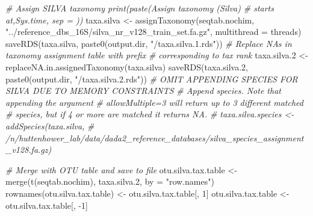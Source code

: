 \documentclass[
]{article}
\newenvironment{Shaded}{\begin{snugshade}}{\end{snugshade}}
\newcommand{\AttributeTok}[1]{\textcolor[rgb]{0.77,0.63,0.00}{#1}}
\newcommand{\CommentTok}[1]{\textcolor[rgb]{0.56,0.35,0.01}{\textit{#1}}}
\newcommand{\DecValTok}[1]{\textcolor[rgb]{0.00,0.00,0.81}{#1}}
\newcommand{\FloatTok}[1]{\textcolor[rgb]{0.00,0.00,0.81}{#1}}
\newcommand{\FunctionTok}[1]{\textcolor[rgb]{0.00,0.00,0.00}{#1}}
\newcommand{\NormalTok}[1]{#1}
\newcommand{\OtherTok}[1]{\textcolor[rgb]{0.56,0.35,0.01}{#1}}
\newcommand{\SpecialCharTok}[1]{\textcolor[rgb]{0.00,0.00,0.00}{#1}}
\newcommand{\StringTok}[1]{\textcolor[rgb]{0.31,0.60,0.02}{#1}}
\begin{document}
\begin{Shaded}
\begin{Highlighting}[]
\CommentTok{\# Assign SILVA taxonomy print(paste(\textquotesingle{}Assign taxonomy (Silva)}
\CommentTok{\# starts at\textquotesingle{},Sys.time, sep = \textquotesingle{} \textquotesingle{}))}
\NormalTok{taxa.silva }\OtherTok{\textless{}{-}} \FunctionTok{assignTaxonomy}\NormalTok{(seqtab.nochim, }\StringTok{"../reference\_dbs\_16S/silva\_nr\_v128\_train\_set.fa.gz"}\NormalTok{, }
    \AttributeTok{multithread =}\NormalTok{ threads)}
\FunctionTok{saveRDS}\NormalTok{(taxa.silva, }\FunctionTok{paste0}\NormalTok{(output.dir, }\StringTok{"/taxa.silva.1.rds"}\NormalTok{))}
\CommentTok{\# Replace NAs in taxonomy assignment table with prefix}
\CommentTok{\# corresponding to tax rank}
\NormalTok{taxa.silva}\FloatTok{.2} \OtherTok{\textless{}{-}} \FunctionTok{replaceNA.in.assignedTaxonomy}\NormalTok{(taxa.silva)}
\FunctionTok{saveRDS}\NormalTok{(taxa.silva}\FloatTok{.2}\NormalTok{, }\FunctionTok{paste0}\NormalTok{(output.dir, }\StringTok{"/taxa.silva.2.rds"}\NormalTok{))}
\CommentTok{\# OMIT APPENDING SPECIES FOR SILVA DUE TO MEMORY CONSTRAINTS}
\CommentTok{\# Append species. Note that appending the argument}
\CommentTok{\# \textquotesingle{}allowMultiple=3\textquotesingle{} will return up to 3 different matched}
\CommentTok{\# species, but if 4 or more are matched it returns NA.}
\CommentTok{\# taxa.silva.species \textless{}{-} addSpecies(taxa.silva,}
\CommentTok{\# \textquotesingle{}/n/huttenhower\_lab/data/dada2\_reference\_databases/silva\_species\_assignment\_v128.fa.gz\textquotesingle{})}

\CommentTok{\# Merge with OTU table and save to file}
\NormalTok{otu.silva.tax.table }\OtherTok{\textless{}{-}} \FunctionTok{merge}\NormalTok{(}\FunctionTok{t}\NormalTok{(seqtab.nochim), taxa.silva}\FloatTok{.2}\NormalTok{, }
    \AttributeTok{by =} \StringTok{"row.names"}\NormalTok{)}
\FunctionTok{rownames}\NormalTok{(otu.silva.tax.table) }\OtherTok{\textless{}{-}}\NormalTok{ otu.silva.tax.table[, }\DecValTok{1}\NormalTok{]}
\NormalTok{otu.silva.tax.table }\OtherTok{\textless{}{-}}\NormalTok{ otu.silva.tax.table[, }\SpecialCharTok{{-}}\DecValTok{1}\NormalTok{]}



\end{Highlighting}
\end{Shaded}
\end{document}
